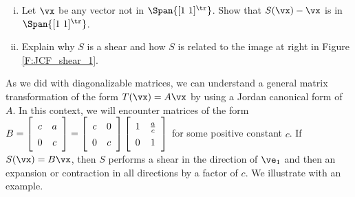 \begin{activity}
\begin{enumerate}[i.]
	\item Let $\vx$ be any vector not in $\Span\{ [1 \ 1]^{\tr}\}$.  Show that $S(\vx) - \vx$ is in $\Span\{ [1 \ 1]^{\tr}\}$. 

	
\item Explain why $S$ is a shear and how $S$ is related to the image at right in Figure \ref{F:JCF_shear_1}.

	\end{enumerate}

\ea

\end{activity}

As we did with diagonalizable matrices, we can understand a general matrix transformation of the form $T(\vx) = A\vx$ by using a Jordan canonical form of $A$. In this context, we will encounter matrices of the form $B = \left[ \begin{array}{cc} c&a\\0&c \end{array} \right] = \left[ \begin{array}{cc} c&0 \\ 0&c \end{array} \right] \left[ \renewcommand{\arraystretch}{1.4} \begin{array}{cc} 1&\frac{a}{c} \\ 0&1 \end{array} \right]$ for some positive constant $c$. If $S(\vx) = B\vx$, then $S$ performs a shear in the direction of $\ve_1$ and then an expansion or contraction in all directions by a factor of $c$. We illustrate with an example.

